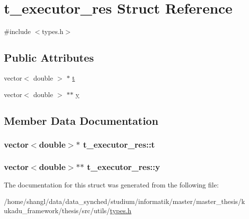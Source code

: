 \hypertarget{structt__executor__res}{\section{t\-\_\-executor\-\_\-res \-Struct \-Reference}
\label{structt__executor__res}
}


{\ttfamily \#include $<$types.\-h$>$}

\subsection*{\-Public \-Attributes}
\begin{DoxyCompactItemize}
\item 
vector$<$ double $>$ $\ast$ \hyperlink{structt__executor__res_a55c54a4b80970b44a879c9d64a27fa5e}{t}
\item 
vector$<$ double $>$ $\ast$$\ast$ \hyperlink{structt__executor__res_a573a00a282e70582abfe6be5b396fe81}{y}
\end{DoxyCompactItemize}


\subsection{\-Member \-Data \-Documentation}
\hypertarget{structt__executor__res_a55c54a4b80970b44a879c9d64a27fa5e}{
\subsubsection[{t}]{\setlength{\rightskip}{0pt plus 5cm}vector$<$double$>$$\ast$ {\bf t\-\_\-executor\-\_\-res\-::t}}}\label{structt__executor__res_a55c54a4b80970b44a879c9d64a27fa5e}
\hypertarget{structt__executor__res_a573a00a282e70582abfe6be5b396fe81}{
\subsubsection[{y}]{\setlength{\rightskip}{0pt plus 5cm}vector$<$double$>$$\ast$$\ast$ {\bf t\-\_\-executor\-\_\-res\-::y}}}\label{structt__executor__res_a573a00a282e70582abfe6be5b396fe81}


\-The documentation for this struct was generated from the following file\-:\begin{DoxyCompactItemize}
\item 
/home/shangl/data/data\-\_\-synched/studium/informatik/master/master\-\_\-thesis/kukadu\-\_\-framework/thesis/src/utils/\hyperlink{types_8h}{types.\-h}\end{DoxyCompactItemize}
